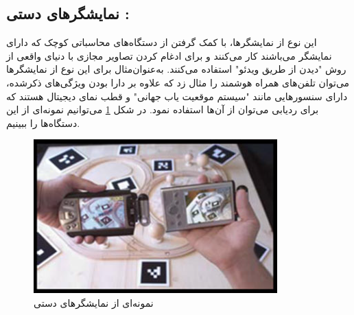\subsection{نمایشگرهای دستی\protect{} :}
این نوع از نمایشگرها، با کمک گرفتن از دستگاه‌های محاسباتی کوچک که دارای نمایشگر می‌باشند کار می‌کنند و برای ادغام کردن تصاویر مجازی با دنیای واقعی از روش "دیدن از طریق ویدئو" استفاده می‌کنند. به‌عنوان‌مثال برای این نوع از نمایشگرها می‌توان تلفن‌های  همراه هوشمند را مثال زد که علاوه بر دارا بودن ویژگی‌های ذکرشده، دارای سنسورهایی مانند "سیستم موقعیت یاب جهانی" و قطب نمای دیجیتال هستند که برای ردیابی می‌توان از آن‌ها استفاده نمود. در شکل \ref{fig:mobile} می‌توانیم نمونه‌ای از این دستگاه‌ها را ببینیم.

\begin{figure}[tb]
	\centering
	\includegraphics[width=0.7\linewidth]{image/mobile}
	\caption {نمونه‌ای از نمایشگرهای دستی\cite{Julie}}
	\label{fig:mobile}
\end{figure}
